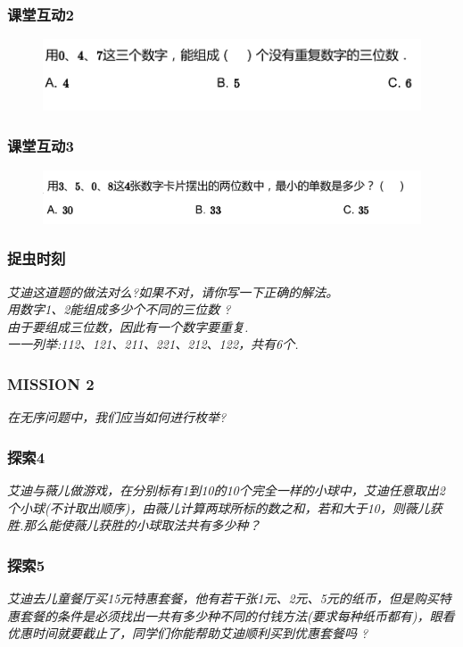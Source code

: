 \begin{frame}
    \frametitle{课堂互动2}
    \begin{figure}[H] 
        \centering
        \includegraphics[width=1\textwidth]{./pics/Chapter_2/ketanghudong2.png}
    \end{figure}
\end{frame}

\begin{frame}
    \frametitle{课堂互动3}
    \begin{figure}[H] 
        \centering
        \includegraphics[width=1\textwidth]{./pics/Chapter_2/ketanghudong3.png}
    \end{figure}
\end{frame}

\begin{frame}
    \frametitle{捉虫时刻}
    \vspace*{-2cm}
    \textit{艾迪这道题的做法对么?如果不对，请你写一下正确的解法。\\
    用数字1、2能组成多少个不同的三位数 ?\\
    由于要组成三位数，因此有一个数字要重复.\\
    一一列举:112、121、211、221、212、122，共有6个.}
\end{frame}

\begin{frame}
    \frametitle{MISSION 2}
    \vspace*{-2cm}
    \textit{在无序问题中，我们应当如何进行枚举?}
\end{frame}

\begin{frame}
    \frametitle{探索4}
    \vspace*{-2cm}
    \textit{艾迪与薇儿做游戏，在分别标有1到10的10个完全一样的小球中，艾迪任意取出2个小球(不计取出顺序)，由薇儿计算两球所标的数之和，若和大于10，则薇儿获胜.那么能使薇儿获胜的小球取法共有多少种？}
\end{frame}

\begin{frame}
    \frametitle{探索5}
    \vspace*{-2cm}
    \textit{艾迪去儿童餐厅买15元特惠套餐，他有若干张1元、2元、5元的纸币，但是购买特惠套餐的条件是必须找出一共有多少种不同的付钱方法(要求每种纸币都有)，眼看优惠时间就要截止了，同学们你能帮助艾迪顺利买到优惠套餐吗 ?}
\end{frame}

